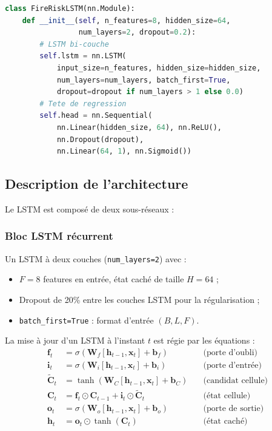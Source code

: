 \documentclass[12pt,a4paper]{report}
\begin{document}
\begin{lstmbox}[title=Architecture FireRiskLSTM]

\begin{lstlisting}[language=Python,backgroundcolor=\color{lstmBlue!5}]
class FireRiskLSTM(nn.Module):
    def __init__(self, n_features=8, hidden_size=64,
                 num_layers=2, dropout=0.2):
        # LSTM bi-couche
        self.lstm = nn.LSTM(
            input_size=n_features, hidden_size=hidden_size,
            num_layers=num_layers, batch_first=True,
            dropout=dropout if num_layers > 1 else 0.0)
        # Tete de regression
        self.head = nn.Sequential(
            nn.Linear(hidden_size, 64), nn.ReLU(),
            nn.Dropout(dropout),
            nn.Linear(64, 1), nn.Sigmoid())
\end{lstlisting}
\end{lstmbox}

\subsection{Description de l'architecture}

Le LSTM est composé de deux sous-réseaux :

\subsubsection{Bloc LSTM récurrent}

Un LSTM à deux couches (\texttt{num\_layers=2}) avec :
\begin{itemize}[leftmargin=*]
  \item $F = 8$ features en entrée, état caché de taille $H = 64$ ;
  \item Dropout de 20\% entre les couches LSTM pour la régularisation ;
  \item \texttt{batch\_first=True} : format d'entrée $(B, L, F)$.
\end{itemize}

La mise à jour d'un LSTM à l'instant $t$ est régie par les équations :
\begin{align}
  \mathbf{f}_t &= \sigma(\mathbf{W}_f [\mathbf{h}_{t-1}, \mathbf{x}_t] + \mathbf{b}_f) \quad &\text{(porte d'oubli)} \\
  \mathbf{i}_t &= \sigma(\mathbf{W}_i [\mathbf{h}_{t-1}, \mathbf{x}_t] + \mathbf{b}_i) \quad &\text{(porte d'entrée)} \\
  \tilde{\mathbf{C}}_t &= \tanh(\mathbf{W}_C [\mathbf{h}_{t-1}, \mathbf{x}_t] + \mathbf{b}_C) \quad &\text{(candidat cellule)} \\
  \mathbf{C}_t &= \mathbf{f}_t \odot \mathbf{C}_{t-1} + \mathbf{i}_t \odot \tilde{\mathbf{C}}_t \quad &\text{(état cellule)} \\
  \mathbf{o}_t &= \sigma(\mathbf{W}_o [\mathbf{h}_{t-1}, \mathbf{x}_t] + \mathbf{b}_o) \quad &\text{(porte de sortie)} \\
  \mathbf{h}_t &= \mathbf{o}_t \odot \tanh(\mathbf{C}_t) \quad &\text{(état caché)}
\end{align}
\end{document}
